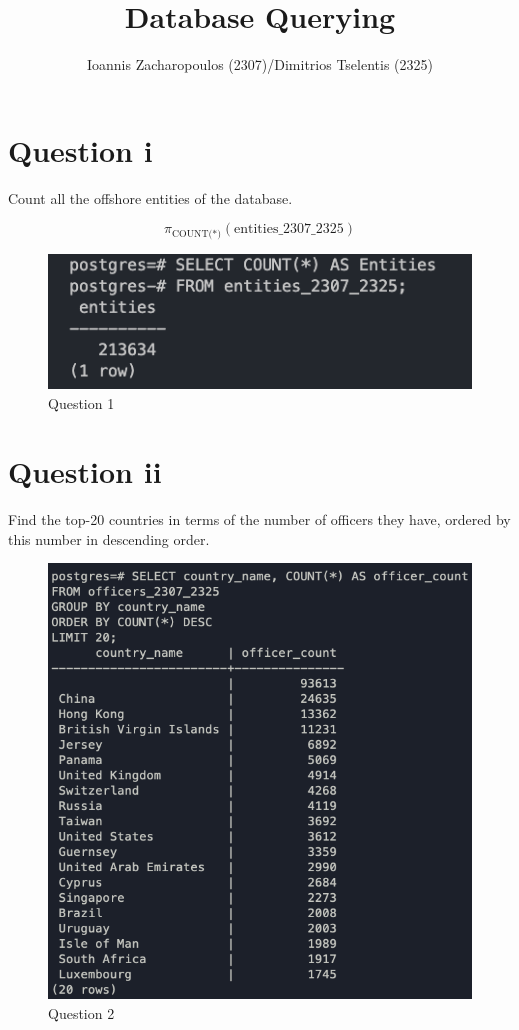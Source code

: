 \documentclass{article}
\title{Database Querying}
\author{Ioannis Zacharopoulos (2307)/Dimitrios Tselentis (2325)}
\begin{document}
\maketitle

\section*{Question i}
Count all the offshore entities of the database.


\[ \pi_{\text{{COUNT(*)}}}(\text{{entities\_2307\_2325}}) \]


\begin{figure}[h]
    \centering
    \includegraphics[width=0.9\linewidth]{Q1.png}
    \captionsetup{labelformat=empty}
    \caption{Question 1}
\end{figure}



\newpage

\section*{Question ii}
Find the top-20 countries in terms of the number of officers they have, ordered by this number in descending order.

\begin{figure}[h]
    \centering
    \includegraphics[width=0.9\linewidth]{Q2.png}
    \captionsetup{labelformat=empty}
    \caption{Question 2}
\end{figure}
\end{document}
